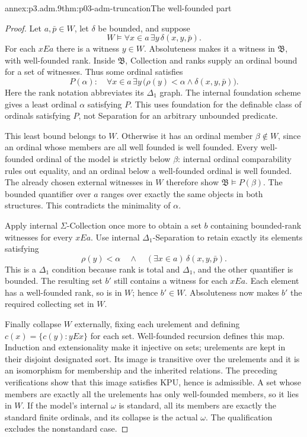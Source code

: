 \begin{annexitem}{annex:p3.adm.9}{thm:p03-adm-truncation}{The well-founded part}
\begin{proof}
Let \(a,\bar p\in W\), let \(\delta\) be bounded, and suppose
\[
 W\models\forall x\in a\,\exists y\,\delta(x,y,\bar p).
\]
For each \(xEa\) there is a witness \(y\in W\). Absoluteness makes it
a witness in \(\mathfrak B\), with well-founded rank. Inside
\(\mathfrak B\), Collection and ranks supply an ordinal bound for a
set of witnesses. Thus some ordinal satisfies
\[
 P(\alpha):\quad
 \forall x\in a\,\exists y\,
       \bigl(\rho(y)<\alpha\land\delta(x,y,\bar p)\bigr).
\]
Here the rank notation abbreviates its \(\Delta_1\) graph. The internal
foundation scheme gives a least ordinal \(\alpha\) satisfying
\(P\). This uses foundation for the definable class of ordinals
satisfying \(P\), not Separation for an arbitrary unbounded predicate.

This least bound belongs to \(W\). Otherwise it has an ordinal member
\(\beta\notin W\), since an ordinal whose members are all well founded
is well founded. Every well-founded ordinal of the model is strictly
below \(\beta\): internal ordinal comparability rules out equality,
and an ordinal below a well-founded ordinal is well founded. The
already chosen external witnesses in \(W\) therefore show
\(\mathfrak B\models P(\beta)\). The bounded quantifier over \(a\)
ranges over exactly the same objects in both structures. This
contradicts the minimality of \(\alpha\).

Apply internal \(\Sigma\)-Collection once more to obtain a set \(b\)
containing bounded-rank witnesses for every \(xEa\). Use internal
\(\Delta_1\)-Separation to retain exactly its elements satisfying
\[
 \rho(y)<\alpha\quad\land\quad
          (\exists x\in a)\,\delta(x,y,\bar p).
\]
This is a \(\Delta_1\) condition because rank is total and
\(\Delta_1\), and the other quantifier is bounded. The resulting set
\(b'\) still contains a witness for each \(xEa\). Each element has a
well-founded rank, so is in \(W\); hence \(b'\in W\). Absoluteness
now makes \(b'\) the required collecting set in \(W\).

Finally collapse \(W\) externally, fixing each urelement and defining
\(c(x)=\{c(y):yEx\}\) for each set. Well-founded recursion defines this
map. Induction and extensionality make it injective on sets; urelements
are kept in their disjoint designated sort. Its image is transitive over
the urelements and it is an isomorphism for membership and the inherited
relations. The preceding verifications show that this image satisfies
\(\mathrm{KPU}\), hence is admissible. A set whose members are exactly
all the urelements has only well-founded members, so it lies in \(W\).
If the model's internal \(\omega\) is standard, all its members are
exactly the standard finite ordinals, and its collapse is the actual
\(\omega\). The qualification excludes the nonstandard case.
\end{proof}
\end{annexitem}
